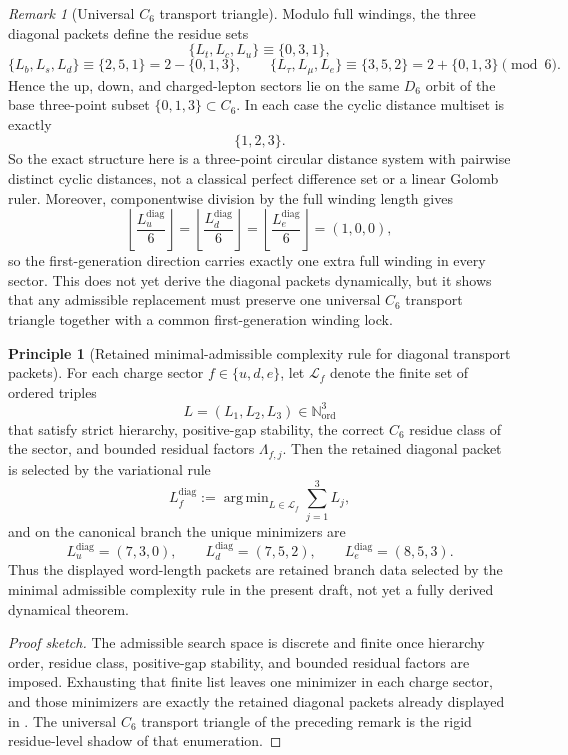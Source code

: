 \documentclass[11pt,a4paper]{article}
\theoremstyle{definition}
\newtheorem{principle}[theorem]{Principle}
\theoremstyle{remark}
\newtheorem*{remark}{Remark}
\DeclareMathOperator{\argmin}{arg\,min}
\begin{document}
\begin{remark}[Universal $C_6$ transport triangle]
Modulo full windings, the three diagonal packets define the residue sets
\[
\{L_t,L_c,L_u\}\equiv\{0,3,1\},
\]
\[
\{L_b,L_s,L_d\}\equiv\{2,5,1\}=2-\{0,1,3\},
\qquad
\{L_\tau,L_\mu,L_e\}\equiv\{3,5,2\}=2+\{0,1,3\}
\pmod 6.
\]
Hence the up, down, and charged-lepton sectors lie on the same $D_6$ orbit of the base three-point subset $\{0,1,3\}\subset C_6$. In each case the cyclic distance multiset is exactly
\[
\{1,2,3\}.
\]
So the exact structure here is a three-point circular distance system with pairwise distinct cyclic distances, not a classical perfect difference set or a linear Golomb ruler.
Moreover, componentwise division by the full winding length gives
\[
\left\lfloor\frac{L_u^{\mathrm{diag}}}{6}\right\rfloor
=
\left\lfloor\frac{L_d^{\mathrm{diag}}}{6}\right\rfloor
=
\left\lfloor\frac{L_e^{\mathrm{diag}}}{6}\right\rfloor
=(1,0,0),
\]
so the first-generation direction carries exactly one extra full winding in every sector. This does not yet derive the diagonal packets dynamically, but it shows that any admissible replacement must preserve one universal $C_6$ transport triangle together with a common first-generation winding lock.
\end{remark}

\begin{principle}[Retained minimal-admissible complexity rule for diagonal transport packets]
\label{prin:minimal-admissible-transport-packets}
For each charge sector $f\in\{u,d,e\}$, let $\mathcal L_f$ denote the finite set of ordered triples
\[
L=(L_1,L_2,L_3)\in\mathbb N_{\mathrm{ord}}^3
\]
that satisfy strict hierarchy, positive-gap stability, the correct $C_6$ residue class of the sector, and bounded residual factors $\Lambda_{f,j}$. Then the retained diagonal packet is selected by the variational rule
\[
L_f^{\mathrm{diag}}
:=
\argmin_{L\in\mathcal L_f}\sum_{j=1}^3 L_j,
\]
and on the canonical branch the unique minimizers are
\[
L_u^{\mathrm{diag}}=(7,3,0),
\qquad
L_d^{\mathrm{diag}}=(7,5,2),
\qquad
L_e^{\mathrm{diag}}=(8,5,3).
\]
Thus the displayed word-length packets are retained branch data selected by the
minimal admissible complexity rule in the present draft, not yet a fully derived
dynamical theorem.
\end{principle}

\begin{proof}[Proof sketch]
The admissible search space is discrete and finite once hierarchy order, residue class, positive-gap stability, and bounded residual factors are imposed. Exhausting that finite list leaves one minimizer in each charge sector, and those minimizers are exactly the retained diagonal packets already displayed in . The universal $C_6$ transport triangle of the preceding remark is the rigid residue-level shadow of that enumeration.
\end{proof}
\end{document}
